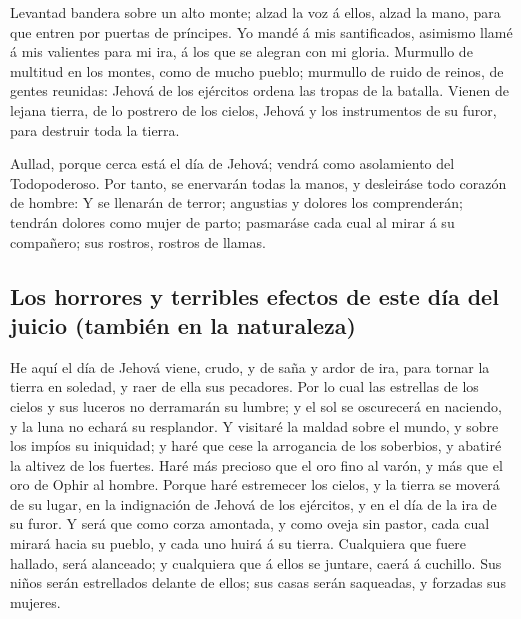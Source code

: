  Levantad bandera sobre un alto monte; alzad la voz á ellos,
alzad la mano, para que entren por puertas de príncipes.  Yo
mandé á mis santificados, asimismo llamé á mis valientes para mi ira, á
los que se alegran con mi gloria.  Murmullo de multitud en
los montes, como de mucho pueblo; murmullo de ruido de reinos, de gentes
reunidas: Jehová de los ejércitos ordena las tropas de la batalla.
 Vienen de lejana tierra, de lo postrero de los cielos,
Jehová y los instrumentos de su furor, para destruir toda la tierra.

 Aullad, porque cerca está el día de Jehová; vendrá como
asolamiento del Todopoderoso.  Por tanto, se enervarán todas
la manos, y desleiráse todo corazón de hombre:  Y se
llenarán de terror; angustias y dolores los comprenderán; tendrán
dolores como mujer de parto; pasmaráse cada cual al mirar á su
compañero; sus rostros, rostros de llamas.

\hypertarget{los-horrores-y-terribles-efectos-de-este-duxeda-del-juicio-tambiuxe9n-en-la-naturaleza}{%
\subsection{Los horrores y terribles efectos de este día del juicio
(también en la
naturaleza)}\label{los-horrores-y-terribles-efectos-de-este-duxeda-del-juicio-tambiuxe9n-en-la-naturaleza}}

 He aquí el día de Jehová viene, crudo, y de saña y ardor de
ira, para tornar la tierra en soledad, y raer de ella sus pecadores.
 Por lo cual las estrellas de los cielos y sus luceros no
derramarán su lumbre; y el sol se oscurecerá en naciendo, y la luna no
echará su resplandor.  Y visitaré la maldad sobre el mundo,
y sobre los impíos su iniquidad; y haré que cese la arrogancia de los
soberbios, y abatiré la altivez de los fuertes.  Haré más
precioso que el oro fino al varón, y más que el oro de Ophir al hombre.
 Porque haré estremecer los cielos, y la tierra se moverá
de su lugar, en la indignación de Jehová de los ejércitos, y en el día
de la ira de su furor.  Y será que como corza amontada, y
como oveja sin pastor, cada cual mirará hacia su pueblo, y cada uno
huirá á su tierra.  Cualquiera que fuere hallado, será
alanceado; y cualquiera que á ellos se juntare, caerá á cuchillo.
 Sus niños serán estrellados delante de ellos; sus casas
serán saqueadas, y forzadas sus mujeres.

